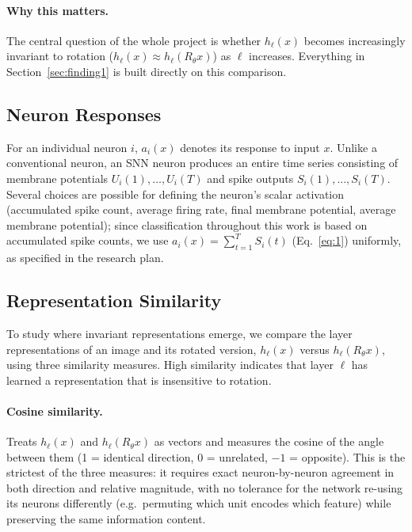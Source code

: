 \documentclass[11pt]{article}
\begin{document}
\paragraph{Why this matters.} The central question of the whole project is whether $h_\ell(x)$
becomes increasingly invariant to rotation ($h_\ell(x) \approx h_\ell(R_\theta x)$) as $\ell$
increases. Everything in Section~\ref{sec:finding1} is built directly on this comparison.

\subsection{Neuron Responses}

For an individual neuron $i$, $a_i(x)$ denotes its response to input $x$. Unlike a conventional
neuron, an SNN neuron produces an entire time series consisting of membrane potentials
$U_i(1), \ldots, U_i(T)$ and spike outputs $S_i(1), \ldots, S_i(T)$. Several choices are possible for
defining the neuron's scalar activation (accumulated spike count, average firing rate, final
membrane potential, average membrane potential); since classification throughout this work is based
on accumulated spike counts, we use $a_i(x) = \sum_{t=1}^{T} S_i(t)$ (Eq.~\ref{eq:1}) uniformly, as
specified in the research plan.

\subsection{Representation Similarity}
\label{sec:repsim}

To study where invariant representations emerge, we compare the layer representations of an image
and its rotated version, $h_\ell(x)$ versus $h_\ell(R_\theta x)$, using three similarity measures.
High similarity indicates that layer $\ell$ has learned a representation that is insensitive to
rotation.

\paragraph{Cosine similarity.} Treats $h_\ell(x)$ and $h_\ell(R_\theta x)$ as vectors and measures the
cosine of the angle between them (1 = identical direction, 0 = unrelated, $-1$ = opposite). This is
the strictest of the three measures: it requires exact neuron-by-neuron agreement in both direction
and relative magnitude, with no tolerance for the network re-using its neurons differently (e.g.\
permuting which unit encodes which feature) while preserving the same information content.
\end{document}
